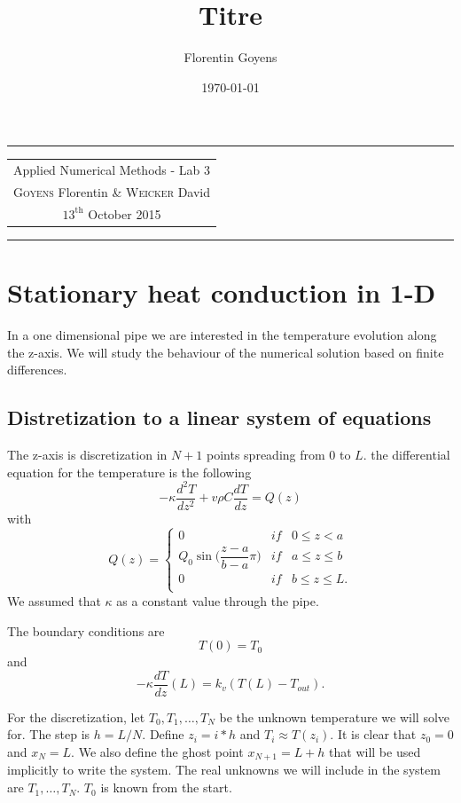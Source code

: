 \documentclass[11pt,a4paper]{report}
\title{Titre}
\author{Florentin Goyens}
\date{\today}
\begin{document}
\tabulinesep=1.2mm
\begin{center}
\hrule
\begin{tabular}{c}
\\[0.005cm]
\Large{Applied Numerical Methods - Lab 3}\\[0.3cm]
\textsc{Goyens} Florentin  \& \textsc{Weicker} David\\[0.2cm]
$\text{13}^{\text{th}}$ October 2015\\[0.2cm]
\end{tabular}
\hrule
\end{center}


\section{Stationary heat conduction in 1-D}

In a one dimensional pipe we are interested in the temperature evolution along the z-axis.  We will study the behaviour of the numerical solution based on finite differences.



\subsection{Distretization to a linear system of equations}

The z-axis is discretization in $N+1$ points spreading from $0$ to $L$. the differential equation for the temperature is the following
$$-\kappa \dfrac{d^{2}T}{dz^{2}} +v\rho C\dfrac{dT}{dz}=Q(z)$$
with $$Q(z)= \left\{ \begin{array}{lll}
0 & if & 0\leq z <a\\
Q_{0}\sin \Big(\dfrac{z-a}{b-a}\pi \Big) & if & a \leq z \leq b\\
0 & if & b\leq z \leq L.\\
\end{array}\right.$$
We assumed that $\kappa$ as a constant value through the pipe.

The boundary conditions are
$$T(0)=T_{0}$$ and $$-\kappa \dfrac{dT}{dz}(L)=k_{v}(T(L)-T_{out}).$$

For the discretization, let $T_{0}, T_{1}, \dots, T_{N}$ be the unknown temperature we will solve for. The step is $h=L/N$. Define $z_{i}=i*h$ and $T_{i}\approx T(z_{i})$. It is clear that $z_0 =0$ and $x_N =L$. We also define the ghost point $x_{N+1}=L+h$ that will be used implicitly to write the system. The real unknowns we will include in the system are  $T_{1}, \dots, T_{N}$. $T_{0}$ is known from the start. 
\end{document}
